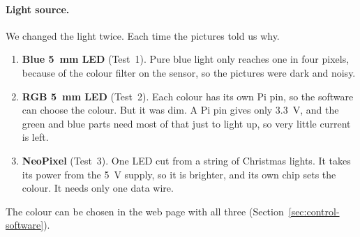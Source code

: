 \paragraph{Light source.}
We changed the light twice. Each time the pictures told us why.
\begin{enumerate}
  \item \textbf{Blue 5~mm LED} (Test~1). Pure blue light only reaches one in four pixels,
  because of the colour filter on the sensor, so the pictures were dark and noisy.
  \item \textbf{RGB 5~mm LED} (Test~2). Each colour has its own Pi pin, so the software can
  choose the colour. But it was dim. A Pi pin gives only 3.3~V, and the green and blue parts
  need most of that just to light up, so very little current is left.
  \item \textbf{NeoPixel} (Test~3). One LED cut from a string of Christmas lights. It takes its
  power from the 5~V supply, so it is brighter, and its own chip sets the colour. It needs only
  one data wire. 
\end{enumerate}
The colour can be chosen in the web page with all three (Section~\ref{sec:control-software}).
